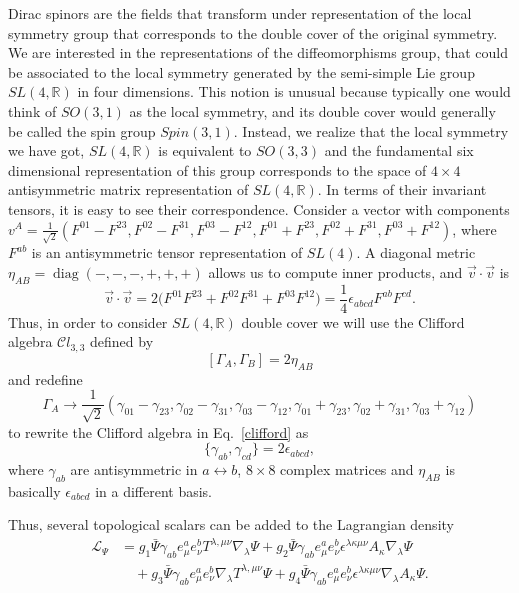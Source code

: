 \documentclass[twocolumn,aps,
  showpacs,showkeys,prd,superscriptaddress]{revtex4-1}
\newcommand{\comm}[2]{\left[#1,#2\right]}
\newcommand*{\diag}{\operatorname{diag}}
\renewcommand{\(}{\left(}
\renewcommand{\)}{\right)}
\renewcommand{\[}{\left[}
\renewcommand{\]}{\right]}
\begin{document}
Dirac spinors are the fields that transform under representation of the local symmetry group that corresponds to the double cover of the original symmetry. We are interested in the representations of the diffeomorphisms group, that could be associated to the local symmetry generated by the semi-simple Lie group $SL(4,\mathbb{R})$ in four dimensions. This notion is unusual because typically one would think of $SO(3,1)$ as the local symmetry, and its double cover would generally be called the spin group $Spin(3,1)$. Instead, we realize that the local symmetry we have got, $SL(4,{\mathbb R})$ is equivalent to $SO(3,3)$ and the fundamental six dimensional representation of this group corresponds to the space of $4\times 4$ antisymmetric matrix representation of $SL(4,{\mathbb R})$. In terms of their invariant tensors, it is easy to see their correspondence. Consider a vector with components 
$v^A=\frac{1}{\sqrt{2}}(F^{01}-F^{23},F^{02}-F^{31},F^{03}-F^{12},F^{01}+F^{23},F^{02}+F^{31},F^{03}+F^{12})$, where $F^{ab}$ is an antisymmetric tensor representation of $SL(4)$. 
A diagonal metric $\eta_{AB} = \diag(-,-,-,+,+,+)$ allows us to compute inner products, and $\vec{v}\cdot\vec{v}$ is 
\begin{dmath}
  \vec{v}\cdot\vec{v} = 2\bigg(F^{01}F^{23}+F^{02}F^{31}+F^{03}F^{12}\bigg)
  =\frac{1}{4}\epsilon_{abcd}F^{ab}F^{cd}.
\end{dmath}
Thus, in order to consider $SL(4,{\mathbb R})$ double cover we will use the Clifford algebra ${\mathcal Cl}_{3,3}$ defined by 
\begin{equation}
  \comm{\Gamma_A}{\Gamma_B} = 2 \eta_{AB}
  \label{clifford}
\end{equation}
and redefine
\begin{dmath}
  \Gamma_A\rightarrow\frac{1}{\sqrt{2}}(\gamma_{01}-\gamma_{23},\gamma_{02}-\gamma_{31},\gamma_{03}-\gamma_{12},\gamma_{01}
  +\gamma_{23},\gamma_{02}+\gamma_{31},\gamma_{03}+\gamma_{12})
\end{dmath} 
to rewrite the Clifford algebra in Eq.~\eqref{clifford} as 
\begin{equation}
  \label{Clifford} 
  \big\{\gamma_{ab},\gamma_{cd}\big\}=2\epsilon_{abcd},
\end{equation}
where $\gamma_{ab}$ are antisymmetric in $a\leftrightarrow b$, $8\times 8$  complex matrices and $\eta_{AB}$ is basically $\epsilon_{abcd} $ in a different basis.

Thus, several topological scalars can be added to the Lagrangian density
\begin{equation}
  \label{SpinorLagrangian}
  \begin{split}
    \mathcal{L}_\Psi &= g_1 \bar\Psi\gamma_{ab}e^a_{\mu}e^b_{\nu}T^{\lambda,\mu\nu}\nabla_\lambda\Psi
    +g_2 \bar\Psi\gamma_{ab}e^a_{\mu}e^b_{\nu}\epsilon^{\lambda\kappa\mu\nu}A_\kappa\nabla_\lambda\Psi \\
    & \quad +g_3 \bar\Psi\gamma_{ab}e^a_{\mu}e^b_{\nu}\nabla_\lambda T^{\lambda,\mu\nu}\Psi
    +g_4 \bar\Psi\gamma_{ab}e^a_{\mu}e^b_{\nu}\epsilon^{\lambda\kappa\mu\nu}\nabla_\lambda A_\kappa\Psi.
  \end{split}
\end{equation}






\end{document}
